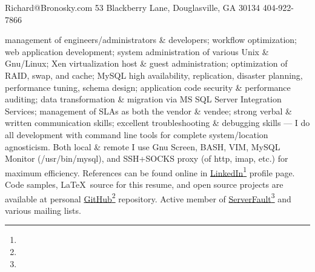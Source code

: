 \documentclass[10pt]{article}
\begin{document}
{Richard@Bronosky.com}
{53 Blackberry Lane, Douglasville, GA 30134}
{404-922-7866}

\begin{longtext}
    management of engineers/administrators \& developers;
    workflow optimization;
    web application development;
    system administration of various Unix \& Gnu/Linux;
    Xen virtualization host \& guest administration;
    optimization of RAID, swap, and cache;
    MySQL high availability, replication, disaster planning, performance tuning, schema design;
    application code security \& performance auditing;
    data transformation \& migration via MS SQL Server Integration Services;
    management of SLAs as both the vendor \& vendee;
    strong verbal \& written communication skills;
    excellent troubleshooting \& debugging skills
    \halfskip
    --- I do all development with command line tools for complete system/location
        agnosticism. Both local \& remote I use Gnu Screen, BASH, VIM, MySQL Monitor
        (/usr/bin/mysql), and SSH+SOCKS proxy (of http, imap, etc.) for maximum efficiency.
        References can be found online in \href{http://www.linkedin.com/in/richardbronosky}{LinkedIn}\footnote{} profile page.
        Code samples, \LaTeX\ source for this resume, and open source projects are available at personal \href{http://github.com/RichardBronosky/}{GitHub}\footnote{} repository.
        Active member of \href{http://serverfault.com/users/4131/richard-bronosky#answers}{ServerFault}\footnote{} and various mailing lists.
        \shortspace
\end{longtext}



\end{document}
